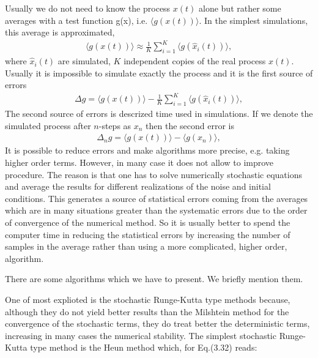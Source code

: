 \documentclass[authoryear,draft,1p,times]{elsarticle}
\renewcommand{\=}{\stackrel{\mathrm{d}}{=}}
\begin{document}
Usually we do not need  to know the process $x(t)$ alone but rather some averages with 
a test function  g(x), i.e. 
$\langle g(x(t))\rangle$. In the simplest simulations, this average is approximated, 
%
\begin{eqnarray}
\label{apr1}
\langle g(x(t))\rangle \approx \frac{1}{K} \sum_{i=1}^K \langle g({\hat x}_i(t))\rangle, 
\end{eqnarray}
%
where  ${\hat x}_i(t)$ are simulated, $K$ independent copies of the real process $x(t)$.  Usually it is impossible to simulate exactly the process and it is the first source of errors
%
\begin{eqnarray}
\label{err1}
\Delta g=\langle g(x(t))\rangle - \frac{1}{K} \sum_{i=1}^K \langle g({\hat x}_i(t))\rangle, 
\end{eqnarray}
%
The second source of errors is descrized time used in simulations. If we denote the simulated process after $n$-steps  as  $x_n$ then  the second error is 
%
\begin{eqnarray}
\label{err2} 
\Delta_n g=\langle g(x(t))\rangle - \langle g( x_n)\rangle, 
\end{eqnarray}
%
    It is possible to reduce errors and make algorithms more precise, e.g. taking higher order terms. 
However, in many case it does not allow to improve procedure. The reason is that 
one has to solve numerically stochastic equations and average the results for
different realizations of the noise and  initial conditions. This generates
a source of statistical errors coming from the averages which are in many  situations 
 greater than the systematic errors due to the order of convergence of the
numerical method. So it is usually better to spend the computer time in reducing
the statistical errors by increasing the number of samples in the average rather
than using a more complicated, higher order, algorithm. 

There  are some algorithms which we have to present. We briefly mention them.  



One of most explioted is the stochastic Runge-Kutta type methods because, although
they do not yield better results than the Milshtein method for the convergence
of the stochastic terms, they do treat better the deterministic terms, increasing
in many cases the numerical stability. The simplest stochastic Runge-Kutta type
method is the Heun method which, for Eq.(3.32) reads:
\end{document}
